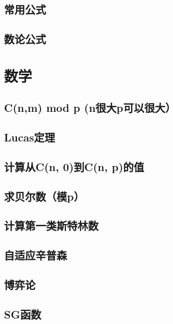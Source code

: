 \section{常用公式}
\raggedbottom
\hrulefill
\section{数论公式}
\raggedbottom
\hrulefill

\chapter{数学}
\section{C(n,m) mod p (n很大p可以很大）}
\raggedbottom
\hrulefill
\section{Lucas定理}
\raggedbottom
\hrulefill
\section{计算从C(n, 0)到C(n, p)的值}
\raggedbottom
\hrulefill
\section{求贝尔数（模p）}
\raggedbottom
\hrulefill
\section{计算第一类斯特林数}
\raggedbottom
\hrulefill
\section{自适应辛普森}
\raggedbottom
\hrulefill
\section{博弈论}
\raggedbottom
\hrulefill
\section{SG函数}
\raggedbottom
\hrulefill
